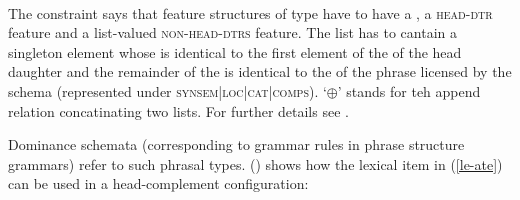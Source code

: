 \documentclass[output=paper]{langsci/langscibook}
\begin{document}
\ea
\label{schema-bin-prel}
 \impl\\
\z
The constraint says that feature structures of type  have to have a
\synsemv, a \textsc{head-dtr} feature and a list-valued \textsc{non-head-dtrs} feature. The list has
to cantain a singleton element whose \synsemv is identical to the first element of the \compsl
of the head daughter  and the remainder of the \compsl {} is identical to the
\compsv of the phrase licensed by the schema (represented under
\textsc{synsem|loc|cat|comps}). `$\oplus$'\is{$\oplus$} stands for teh append relation concatinating
two lists. For further details see .

Dominance schemata (corresponding to grammar rules in phrase structure grammars) refer to such
phrasal types. () shows how the lexical item in (\ref{le-ate}) can be used in a
head-complement configuration:
\end{document}
